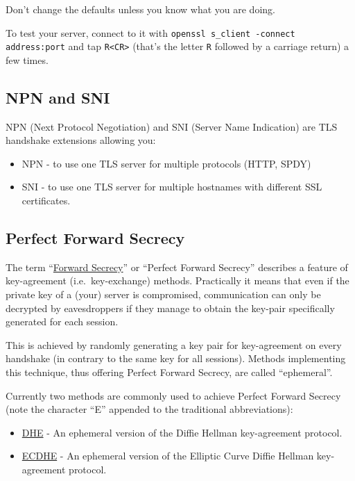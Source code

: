 Don't change the defaults unless you know what you are doing.

To test your server, connect to it with
\texttt{openssl s\_client -connect address:port} and tap
\texttt{R\textless{}CR\textgreater{}} (that's the letter \texttt{R}
followed by a carriage return) a few times.

\subsection{NPN and SNI}\label{npn-and-sni}

NPN (Next Protocol Negotiation) and SNI (Server Name Indication) are TLS
handshake extensions allowing you:

\begin{itemize}
\itemsep1pt\parskip0pt
\item
  NPN - to use one TLS server for multiple protocols (HTTP, SPDY)
\item
  SNI - to use one TLS server for multiple hostnames with different SSL
  certificates.
\end{itemize}

\subsection{Perfect Forward Secrecy}\label{perfect-forward-secrecy}

The term
``\href{http://en.wikipedia.org/wiki/Perfect_forward_secrecy}{Forward
Secrecy}'' or ``Perfect Forward Secrecy'' describes a feature of
key-agreement (i.e.~key-exchange) methods. Practically it means that
even if the private key of a (your) server is compromised, communication
can only be decrypted by eavesdroppers if they manage to obtain the
key-pair specifically generated for each session.

This is achieved by randomly generating a key pair for key-agreement on
every handshake (in contrary to the same key for all sessions). Methods
implementing this technique, thus offering Perfect Forward Secrecy, are
called ``ephemeral''.

Currently two methods are commonly used to achieve Perfect Forward
Secrecy (note the character ``E'' appended to the traditional
abbreviations):

\begin{itemize}
\itemsep1pt\parskip0pt
\item
  \href{https://en.wikipedia.org/wiki/Diffie\%E2\%80\%93Hellman_key_exchange}{DHE}
  - An ephemeral version of the Diffie Hellman key-agreement protocol.
\item
  \href{https://en.wikipedia.org/wiki/Elliptic_curve_Diffie\%E2\%80\%93Hellman}{ECDHE}
  - An ephemeral version of the Elliptic Curve Diffie Hellman
  key-agreement protocol.
\end{itemize}

